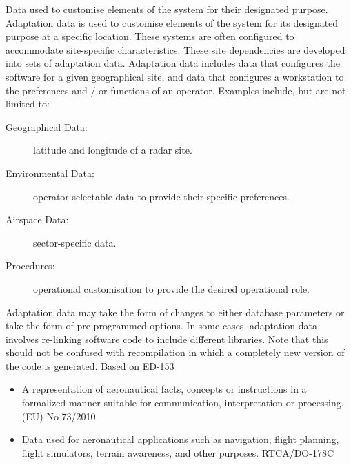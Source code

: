 %
	{Data used to customise elements of the system for their designated purpose.
		Adaptation data is used to customise elements of the system for its designated purpose at a specific location.
		These systems are often configured to accommodate site-specific characteristics.
		These site dependencies are developed into sets of adaptation data.
		Adaptation data includes data that configures the software for a given geographical site, and data that configures a workstation to the preferences and / or functions of an operator.
		Examples include, but are not limited to:
		\begin{description}
			\item[Geographical Data:] latitude and longitude of a radar site.
			\item[Environmental Data:] operator selectable data to provide their specific preferences.
			\item[Airspace Data:] sector-specific data.
			\item[Procedures:] operational customisation to provide the desired operational role.
		\end{description}
		Adaptation data may take the form of changes to either database parameters or take the form of pre-programmed options.
		In some cases, adaptation data involves re-linking software code to include different libraries.
		Note that this should not be confused with recompilation in which a completely new version of the code is generated. Based on ED-153 \cite{citation:ED153}}

%
	{\begin{itemize}
	\item A representation of aeronautical facts, concepts or instructions in a formalized manner suitable for communication, interpretation or processing. (EU) No 73/2010 \cite{citation:EU732010}
	\item Data used for aeronautical applications such as navigation, flight planning, flight simulators, terrain awareness, and other purposes. RTCA/DO-178C \cite{citation:ED12C}
	\end{itemize}}


